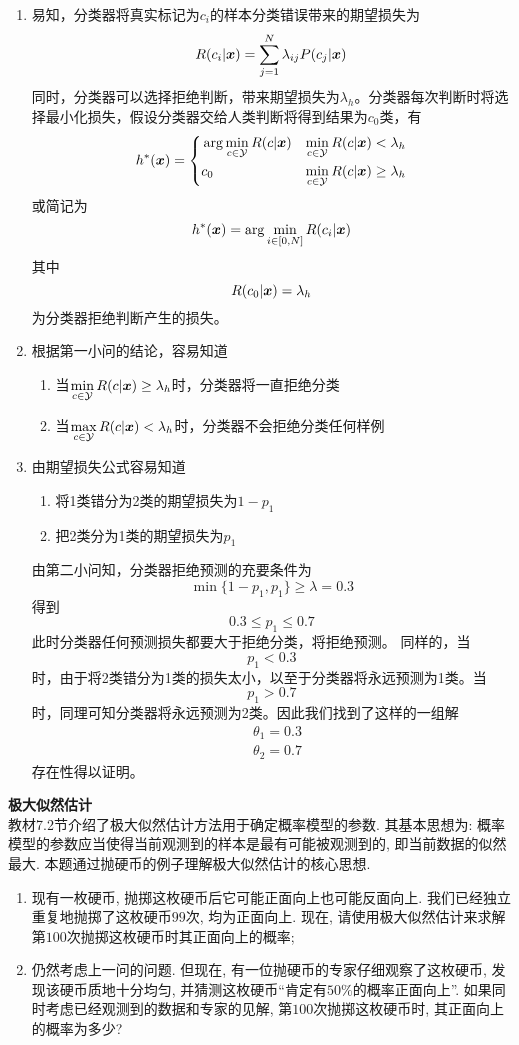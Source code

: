 \documentclass[answers]{exam}  %
\begin{document}
\begin{questions}
\begin{solution}
	\begin{enumerate}
		\item 	易知，分类器将真实标记为$c_i$的样本分类错误带来的期望损失为
			\[R(c_i|{\boldsymbol{x}})=\sum^N_{j=1}\lambda_{ij}P(c_j|{\boldsymbol{x}})\]
			同时，分类器可以选择拒绝判断，带来期望损失为$\lambda_h$。分类器每次判断时将选择最小化损失，假设分类器交给人类判断将得到结果为$c_0$类，有
			\[h^*({\boldsymbol{x}})=
				\left\{
					\begin{aligned}
						&\arg\min\limits_{c\in\mathcal Y} R(c|{\boldsymbol{x}})& \min\limits_{c\in\mathcal Y} R(c|{\boldsymbol{x}})< \lambda_h\\
						&c_0&\min\limits_{c\in\mathcal Y} R(c|{\boldsymbol{x}})\ge\lambda_h
					\end{aligned}
				\right.
			\]
			或简记为
			\[h^*({\boldsymbol{x}})=\arg\min_{i\in[0, N]}R(c_i|{\boldsymbol{x}})\]
			其中
			\[R(c_0|{\boldsymbol{x}})=\lambda_h\]
			为分类器拒绝判断产生的损失。
		\item 根据第一小问的结论，容易知道
		\begin{enumerate}
			\item 当$\min\limits_{c\in\mathcal Y} R(c|{\boldsymbol{x}})\ge\lambda_h$时，分类器将一直拒绝分类
			\item 当$\max\limits_{c\in\mathcal Y} R(c|{\boldsymbol{x}})<\lambda_h$时，分类器不会拒绝分类任何样例
		\end{enumerate}
		\item 由期望损失公式容易知道
		\begin{enumerate}
			\item 将1类错分为2类的期望损失为$1-p_1$
			\item 把2类分为1类的期望损失为$p_1$
		\end{enumerate}
		由第二小问知，分类器拒绝预测的充要条件为
		\[\min\{1-p_1,p_1\} \ge\lambda=0.3\]
		得到
		\[0.3\le p_1\le0.7\]
		此时分类器任何预测损失都要大于拒绝分类，将拒绝预测。
		同样的，当
		\[p_1<0.3\]
		时，由于将2类错分为1类的损失太小，以至于分类器将永远预测为1类。当
		\[p_1>0.7\]
		时，同理可知分类器将永远预测为2类。因此我们找到了这样的一组解
		\[
			\begin{aligned}
				&\theta_1=0.3\\
				&\theta_2=0.7
			\end{aligned}
		\]
		存在性得以证明。
	\end{enumerate}
\end{solution}

\question [20] \textbf{极大似然估计} \\
教材7.2节介绍了极大似然估计方法用于确定概率模型的参数. 其基本思想为: 概率模型的参数应当使得当前观测到的样本是最有可能被观测到的, 即当前数据的似然最大. 本题通过抛硬币的例子理解极大似然估计的核心思想. 
\begin{enumerate}
	\item 现有一枚硬币, 抛掷这枚硬币后它可能正面向上也可能反面向上. 我们已经独立重复地抛掷了这枚硬币$99$次, 均为正面向上. 现在, 请使用极大似然估计来求解第$100$次抛掷这枚硬币时其正面向上的概率;
	\item 仍然考虑上一问的问题. 但现在, 有一位抛硬币的专家仔细观察了这枚硬币, 发现该硬币质地十分均匀, 并猜测这枚硬币“肯定有$50\%$的概率正面向上”. 如果同时考虑已经观测到的数据和专家的见解, 第$100$次抛掷这枚硬币时, 其正面向上的概率为多少?
	

\end{enumerate}
\end{questions}
\end{document}
